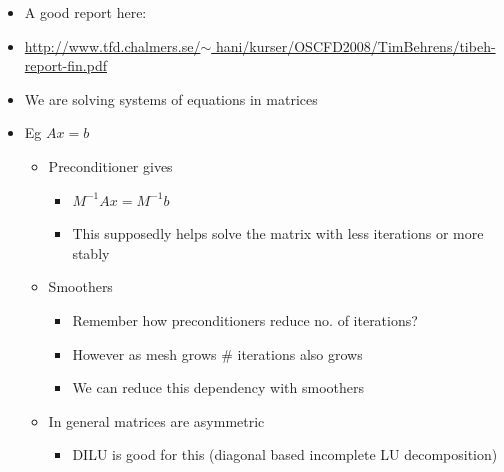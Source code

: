 \documentclass[12pt]{article}
\renewcommand{\_}{\kern-1.5pt\textunderscore\kern-1.5pt}
\begin{document}
\begin{itemize}
	\item A good report here:\par

	\item \href{http://www.tfd.chalmers.se/~hani/kurser/OS_CFD_2008/TimBehrens/tibeh-report-fin.pdf}{http://www.tfd.chalmers.se/$ \sim $ hani/kurser/OS\_CFD\_2008/TimBehrens/tibeh-report-fin.pdf}\par

	\item We are solving systems of equations in matrices\par

	\item Eg  \( Ax=b \) \par

\begin{itemize}
	\item Preconditioner gives\par

\begin{itemize}
	\item  \( M^{-1}Ax=M^{-1}b \) \par

	\item This supposedly helps solve the matrix with less iterations or more stably\par


\end{itemize}
	\item Smoothers \par

\begin{itemize}
	\item Remember how preconditioners reduce no. of iterations?\par

	\item However as mesh grows $\#$  iterations also grows\par

	\item We can reduce this dependency with smoothers\par


\end{itemize}
	\item In general matrices are asymmetric\par

\begin{itemize}
	\item DILU is good for this (diagonal based incomplete LU decomposition)\par


\end{itemize}
\end{itemize}
\end{itemize}
\end{document}
